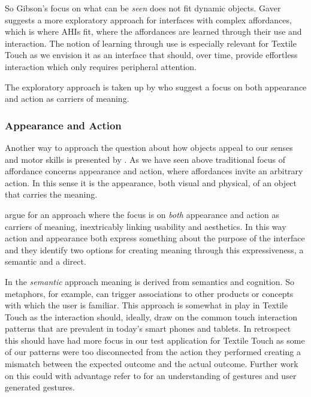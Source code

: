 So Gibson's focus on what can be \emph{seen} does not fit dynamic objects.
Gaver suggests a more exploratory approach for interfaces with complex affordances, which is where AHIs fit, where the affordances are learned through their use and interaction.
The notion of learning through use is especially relevant for Textile Touch as we envision it as an interface that should, over time, provide effortless interaction which only requires peripheral attention.

The exploratory approach is taken up by \citet{djajadiningrat2004tangible} who suggest a focus on both appearance and action as carriers of meaning.

\subsubsection{Appearance and Action}
Another way to approach the question about how objects appeal to our senses and motor skills is presented by \citet{djajadiningrat2004tangible}.
As we have seen above traditional focus of affordance concerns appearance and action, where affordances invite an arbitrary action. 
In this sense it is the appearance, both visual and physical, of an object that carries the meaning.

\citeauthor{djajadiningrat2004tangible} argue for an approach where the focus is on \emph{both} appearance and action as carriers of meaning, inextricably linking usability and aesthetics.
In this way action and appearance both express something about the purpose of the interface and they identify two options for creating meaning through this expressiveness, a semantic and a direct.

In the \emph{semantic} approach meaning is derived from semantics and cognition.
So metaphors, for example, can trigger associations to other products or concepts with which the user is familiar.
This approach is somewhat in play in Textile Touch as the interaction should, ideally, draw on the common touch interaction patterns that are prevalent in today's smart phones and tablets.
In retrospect this should have had more focus in our test application for Textile Touch as some of our patterns were too disconnected from the action they performed creating a mismatch between the expected outcome and the actual outcome.
Further work on this could with advantage refer to \citep{wobbrock2009user,morris2010understanding} for an understanding of gestures and user generated gestures.

